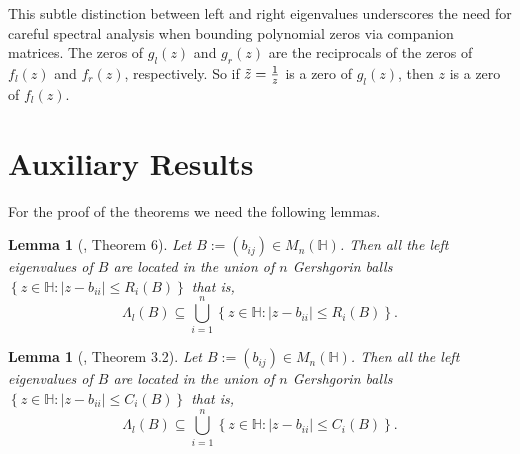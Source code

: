 \documentclass [12pt]{article}
\newtheorem{lemma}[theorem]{Lemma}
\begin{document}
This subtle distinction between left and right eigenvalues underscores the need for careful spectral analysis when bounding polynomial zeros via companion matrices.  
The zeros of \(g_{l}(z)\) and \(g_{r}(z)\) are the reciprocals of the zeros of \(f_{l}(z)\) and \(f_{r}(z)\), respectively. So if ${\Tilde{z}}=\frac{1}{z}$  is a zero of \(g_{l}(z)\), then $z$ is a zero of  \(f_{l}(z)\).
\\
\section{Auxiliary Results} For the proof of the theorems we need the following lemmas.

\begin{lemma}[\cite{ZF1}, Theorem 6]{\label{lemma 3.1}}
	Let $B:=(b_{ij})\in M_{n}{(\mathbb{H})}$. Then all the left eigenvalues of $B$ are located in the union of $n$ Gershgorin balls $\left\{z\in\mathbb{H}: |z-b_{ii}|\le  R_i(B)\right\}$ that is,
	$$\Lambda_{l}(B)\subseteq \bigcup\limits_{i=1}^{n} \left\{z\in\mathbb{H}: |z-b_{ii}|\le  R_i(B)\right\}.$$
\end{lemma}

\begin{lemma}[\cite{ASS2}, Theorem 3.2]{\label{lemma 3.2}}
	Let $B:=(b_{ij})\in M_{n}{(\mathbb{H})}$. Then all the left eigenvalues of $B$ are located in the union of $n$ Gershgorin balls $\left\{z\in\mathbb{H}: |z-b_{ii}|\le  C_i(B)\right\}$ that is,
	$$\Lambda_{l}(B)\subseteq \bigcup\limits_{i=1}^{n} \left\{z\in\mathbb{H}: |z-b_{ii}|\le  C_i(B)\right\}.$$
\end{lemma}
\end{document}
